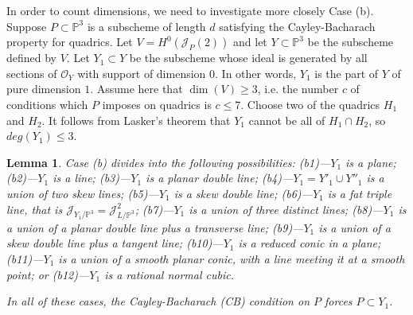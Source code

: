 \documentclass{amsart}
\theoremstyle{plain}
\newtheorem{lemma}[theorem]{Lemma}
\numberwithin{equation}{section}
\begin{document}
In order to count dimensions, we need to investigate more closely
Case (b). 
Suppose $P\subset {{\mathbb P}} ^3$ is a subscheme of length $d$ satisfying the 
Cayley-Bacharach property for quadrics. Let $V=H^0({{\mathcal J}} _P(2))$ and let
$Y\subset {{\mathbb P}} ^3$ be the subscheme defined by $V$. Let $Y_1\subset Y$ be the
subscheme whose ideal is 
generated by all sections of ${{\mathcal O}} _Y$ with support of dimension $0$. In other words,
$Y_1$ is the part of $Y$ of pure dimension $1$.  
Assume here that $\dim (V)\geq 3$, i.e. the number $c$ of conditions which $P$ imposes
on quadrics is $c\leq 7$. Choose two of the quadrics $H_1$ and $H_2$.
It follows from Lasker's theorem
\cite[p. 314]{EisenbudGreenHarris} that $Y_1$ cannot
be all of $H_1\cap H_2$, so $deg(Y_1)\leq 3$.

\begin{lemma}
\label{PinY}
Case (b) divides into the following possibilities:
\newline
(b1)---$Y_1$ is a plane;
\newline
(b2)---$Y_1$ is a line;
\newline
(b3)---$Y_1$ is a planar double line;
\newline
(b4)---$Y_1=Y'_1\cup Y''_1$ is a union of two skew lines;
\newline
(b5)---$Y_1$ is a skew double line;
\newline
(b6)---$Y_1$ is a fat triple line, that is ${{\mathcal J}} _{Y_1/{{\mathbb P}} ^3}= {{\mathcal J}} _{L/{{\mathbb P}} ^3}^2$;
\newline
(b7)---$Y_1$ is a union of three distinct lines;
\newline
(b8)---$Y_1$ is a union of a planar double line plus a transverse line;
\newline
(b9)---$Y_1$ is a union of a skew double line plus a tangent line;
\newline
(b10)---$Y_1$ is a reduced conic in a plane; 
\newline
(b11)---$Y_1$ is a union of a smooth planar conic, with a line meeting it at a smooth point;
or
\newline
(b12)---$Y_1$ is a rational normal cubic.

In all of these cases, the Cayley-Bacharach (CB) condition on $P$ forces
$P\subset Y_1$.
\end{lemma}
\end{document}
